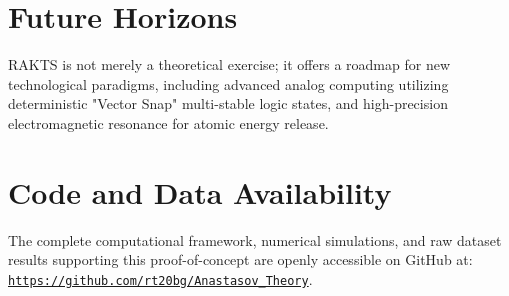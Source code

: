 \documentclass[reprint,amsmath,amssymb,aps,prd,twocolumn]{revtex4-2}
\begin{document}
\section{Future Horizons}
RAKTS is not merely a theoretical exercise; it offers a roadmap for new technological paradigms, including advanced analog computing utilizing deterministic "Vector Snap" multi-stable logic states, and high-precision electromagnetic resonance for atomic energy release.

\section*{Code and Data Availability}
The complete computational framework, numerical simulations, and raw dataset results supporting this proof-of-concept are openly accessible on GitHub at: \href{https://github.com/rt20bg/Anastasov_Theory}{\texttt{https://github.com/rt20bg/Anastasov\_Theory}}.
\end{document}
